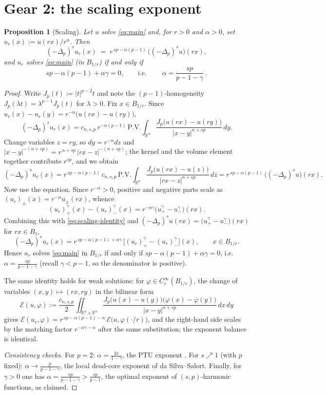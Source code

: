 \documentclass[11pt]{amsart}
\theoremstyle{plain}
\newtheorem{proposition}[theorem]{Proposition}
\theoremstyle{definition}
\theoremstyle{remark}
\newcommand{\R}{\mathbb{R}}
\newcommand{\fpl}[1]{(-\Delta_p)^{s}#1}            %
\newcommand{\Jp}[1]{|#1|^{p-2}#1}                  %
\newcommand{\al}{\alpha}
\begin{document}
\section{Gear 2: the scaling exponent}\label{sec:scaling}
\begin{proposition}[Scaling]\label{prop:scaling}
Let $u$ solve \eqref{eq:main} and, for $r>0$ and $\al>0$, set
$u_r(x):=u(rx)/r^{\al}$. Then
\[
  \fpl{u_r}(x) \;=\; r^{\,sp-\al(p-1)}\,\big(\fpl{u}\big)(rx),
\]
and $u_r$ solves \eqref{eq:main} (in $B_{1/r}$) if and only if
\[
  sp-\al(p-1)+\al\gamma=0,
  \qquad\text{i.e.}\qquad
  \boxed{\;\al=\frac{sp}{p-1-\gamma}\;}.
\]
\end{proposition}
\begin{proof}
Write $J_p(t):=\Jp{t}$ and note the $(p-1)$-homogeneity
$J_p(\lambda t)=\lambda^{p-1}J_p(t)$ for $\lambda>0$.
Fix $x\in B_{1/r}$. Since $u_r(x)-u_r(y)=r^{-\al}\big(u(rx)-u(ry)\big)$,
\[
  \fpl{u_r}(x)
  = c_{n,s,p}\,r^{-\al(p-1)}\,\mathrm{P.V.}\!\int_{\R^n}
    \frac{J_p\big(u(rx)-u(ry)\big)}{|x-y|^{n+sp}}\,dy .
\]
Change variables $z=ry$, so $dy=r^{-n}dz$ and
$|x-y|^{-(n+sp)}=r^{\,n+sp}\,|rx-z|^{-(n+sp)}$; the kernel and the volume
element together contribute $r^{sp}$, and we obtain
\begin{equation}\label{eq:scaling-identity}
  \fpl{u_r}(x)
  = r^{\,sp-\al(p-1)}\,
    c_{n,s,p}\,\mathrm{P.V.}\!\int_{\R^n}
    \frac{J_p\big(u(rx)-u(z)\big)}{|rx-z|^{n+sp}}\,dz
  = r^{\,sp-\al(p-1)}\,\big(\fpl{u}\big)(rx).
\end{equation}
Now use the equation. Since $r^{-\al}>0$, positive and negative parts
scale as $(u_r)_\pm(x)=r^{-\al}u_\pm(rx)$, whence
\[
  (u_r)_+^{\gamma}(x)-(u_r)_-^{\gamma}(x)
  = r^{-\al\gamma}\Big(u_+^{\gamma}-u_-^{\gamma}\Big)(rx).
\]
Combining this with \eqref{eq:scaling-identity} and
$\fpl{u}(rx)=\big(u_+^{\gamma}-u_-^{\gamma}\big)(rx)$ for $rx\in B_1$,
\[
  \fpl{u_r}(x)
  = r^{\,sp-\al(p-1)+\al\gamma}\,
    \Big[(u_r)_+^{\gamma}-(u_r)_-^{\gamma}\Big](x),
  \qquad x\in B_{1/r}.
\]
Hence $u_r$ solves \eqref{eq:main} in $B_{1/r}$ if and only if
$sp-\al(p-1)+\al\gamma=0$, i.e.\ $\al=\frac{sp}{p-1-\gamma}$
(recall $\gamma<p-1$, so the denominator is positive).

The same identity holds for weak solutions: for
$\varphi\in C_c^\infty(B_{1/r})$, the change of variables
$(x,y)\mapsto(rx,ry)$ in the bilinear form
\[
  \mathcal{E}(u,\varphi)
  := \frac{c_{n,s,p}}{2}\iint_{\R^n\times\R^n}
     \frac{J_p\big(u(x)-u(y)\big)\big(\varphi(x)-\varphi(y)\big)}
          {|x-y|^{n+sp}}\,dx\,dy
\]
gives $\mathcal{E}(u_r,\varphi)=r^{\,sp-\al(p-1)-n}\,
\mathcal{E}\big(u,\varphi(\cdot/r)\big)$, and the right-hand side scales
by the matching factor $r^{-\al\gamma-n}$ after the same substitution;
the exponent balance is identical.

\emph{Consistency checks.} For $p=2$:
$\al=\frac{2s}{1-\gamma}$, the PTU exponent \cite{PTU}. For $s\nearrow1$
(with $p$ fixed): $\al\to\frac{p}{p-1-\gamma}$, the local dead-core
exponent of da Silva--Salort. Finally, for $\gamma>0$ one has
$\al=\frac{sp}{p-1-\gamma}>\frac{sp}{p-1}$, the optimal exponent of
$(s,p)$-harmonic functions, as claimed.
\end{proof}
\end{document}
